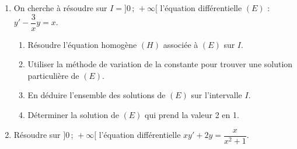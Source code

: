 
\begin{exercice}\label{exoautoanalyseCTU-34bis}

\begin{enumerate}
\item On cherche à résoudre sur $I = ]0\,;\,+\infty[$ l'équation différentielle $(E)$ : $y'-\dfrac{3}{x}y=x$.
    \begin{enumerate}
    \item Résoudre l'équation homogène $(H)$ associée à $(E)$ sur $I$.
    \item Utiliser la méthode de variation de la constante pour trouver une solution particulière de $(E)$.
    \item En déduire l'ensemble des solutions de $(E)$ sur l'intervalle $I$.
    \item Déterminer la solution de $(E)$ qui prend la valeur 2 en 1.


    \end{enumerate}


  \item Résoudre  sur $]0\,;\,+\infty[$ l'équation différentielle $xy'+2y=\dfrac{x}{x^2+1}$.
\end{enumerate}

\end{exercice}
